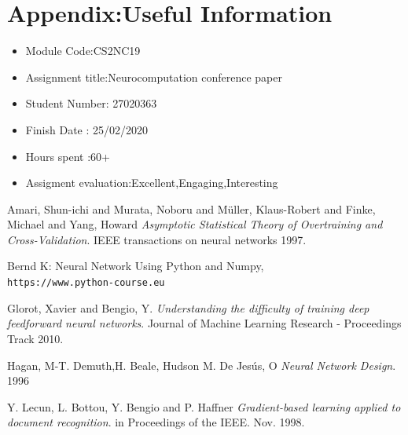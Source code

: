 \documentclass{proc}
\begin{document}
	\section{Appendix:Useful Information}
	\begin{itemize}
		\item Module Code:CS2NC19
		\item Assignment title:Neurocomputation conference paper 
		\item Student Number: 27020363 
		\item Finish Date : 25/02/2020
		\item Hours spent :60+
		\item Assigment evaluation:Excellent,Engaging,Interesting
	\end{itemize}
	
	\begin{thebibliography}{9}
		Amari, Shun-ichi and Murata, Noboru and Müller, Klaus-Robert and Finke, Michael and Yang, Howard 
		\textit{Asymptotic Statistical Theory of Overtraining and Cross-Validation}. 
		IEEE transactions on neural networks 1997.
		
		Bernd K: Neural Network Using Python and Numpy,
		\\\texttt{https://www.python-course.eu}
		
		Glorot, Xavier and Bengio, Y. 
		\textit{Understanding the difficulty of training deep feedforward neural networks}. 
		Journal of Machine Learning Research - Proceedings Track 2010.
		
		Hagan, M-T. Demuth,H. Beale, Hudson M. De Jesús, O
		\textit{Neural Network Design}.
		1996
		
		Y. Lecun, L. Bottou, Y. Bengio and P. Haffner
		\textit{Gradient-based learning applied to document recognition}.
		in Proceedings of the IEEE. Nov. 1998.
		
	\end{thebibliography}

	
\end{document}
